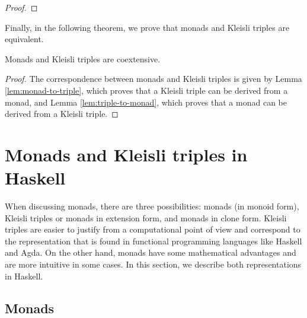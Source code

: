 \begin{lemma}
\begin{proof}
  \end{proof}

\end{lemma}

Finally, in the following theorem, we prove that monads and Kleisli
triples are equivalent.

\begin{theorem}
  \label{the:monad-triple}

  Monads and Kleisli triples are coextensive.

  \begin{proof}

    The correspondence between monads and Kleisli triples is given by
    Lemma \ref{lem:monad-to-triple}, which proves that a Kleisli
    triple can be derived from a monad, and Lemma
    \ref{lem:triple-to-monad}, which proves that a monad can be
    derived from a Kleisli triple.

  \end{proof}

\end{theorem}

\section{Monads and Kleisli triples in Haskell}
\label{sec:monads-haskell}

When discussing monads, there are three possibilities: monads (in
monoid form), Kleisli triples or monads in extension form, and monads
in clone form. Kleisli triples are easier to justify from a
computational point of view and correspond to the representation that
is found in functional programming languages like Haskell and Agda. On
the other hand, monads have some mathematical advantages and are more
intuitive in some cases. In this section, we describe both
representations in Haskell.

\subsection*{Monads}


